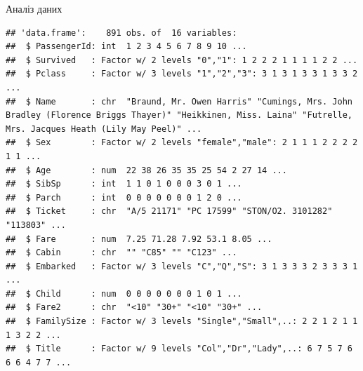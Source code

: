 \documentclass[ignorenonframetext,]{beamer}
\newenvironment{Shaded}{\begin{snugshade}}{\end{snugshade}}
\newcommand{\CommentTok}[1]{\textcolor[rgb]{0.56,0.35,0.01}{\textit{#1}}}
\newcommand{\DataTypeTok}[1]{\textcolor[rgb]{0.13,0.29,0.53}{#1}}
\newcommand{\KeywordTok}[1]{\textcolor[rgb]{0.13,0.29,0.53}{\textbf{#1}}}
\newcommand{\NormalTok}[1]{#1}
\newcommand{\OperatorTok}[1]{\textcolor[rgb]{0.81,0.36,0.00}{\textbf{#1}}}
\newcommand{\StringTok}[1]{\textcolor[rgb]{0.31,0.60,0.02}{#1}}
\begin{document}
\begin{frame}[fragile]{Аналіз даних}
\protect\hypertarget{ux430ux43dux430ux43bux456ux437-ux434ux430ux43dux438ux445}{}

\begin{Shaded}
\end{Shaded}

\begin{verbatim}
## 'data.frame':    891 obs. of  16 variables:
##  $ PassengerId: int  1 2 3 4 5 6 7 8 9 10 ...
##  $ Survived   : Factor w/ 2 levels "0","1": 1 2 2 2 1 1 1 1 2 2 ...
##  $ Pclass     : Factor w/ 3 levels "1","2","3": 3 1 3 1 3 3 1 3 3 2 ...
##  $ Name       : chr  "Braund, Mr. Owen Harris" "Cumings, Mrs. John Bradley (Florence Briggs Thayer)" "Heikkinen, Miss. Laina" "Futrelle, Mrs. Jacques Heath (Lily May Peel)" ...
##  $ Sex        : Factor w/ 2 levels "female","male": 2 1 1 1 2 2 2 2 1 1 ...
##  $ Age        : num  22 38 26 35 35 25 54 2 27 14 ...
##  $ SibSp      : int  1 1 0 1 0 0 0 3 0 1 ...
##  $ Parch      : int  0 0 0 0 0 0 0 1 2 0 ...
##  $ Ticket     : chr  "A/5 21171" "PC 17599" "STON/O2. 3101282" "113803" ...
##  $ Fare       : num  7.25 71.28 7.92 53.1 8.05 ...
##  $ Cabin      : chr  "" "C85" "" "C123" ...
##  $ Embarked   : Factor w/ 3 levels "C","Q","S": 3 1 3 3 3 2 3 3 3 1 ...
##  $ Child      : num  0 0 0 0 0 0 0 1 0 1 ...
##  $ Fare2      : chr  "<10" "30+" "<10" "30+" ...
##  $ FamilySize : Factor w/ 3 levels "Single","Small",..: 2 2 1 2 1 1 1 3 2 2 ...
##  $ Title      : Factor w/ 9 levels "Col","Dr","Lady",..: 6 7 5 7 6 6 6 4 7 7 ...
\end{verbatim}

\end{frame}
\end{document}
